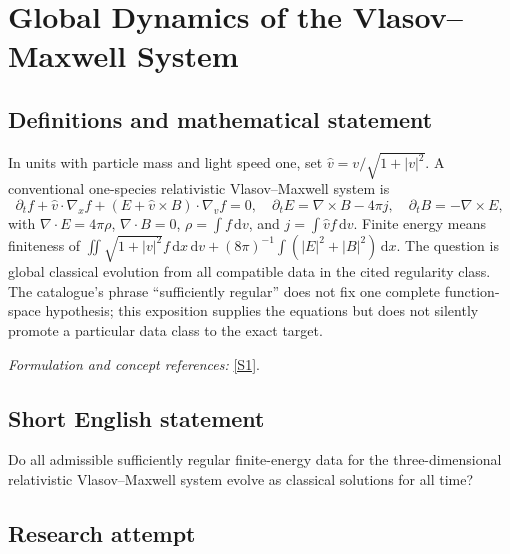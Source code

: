 \documentclass[11pt,a4paper]{article}
\newcommand{\dd}{\,\mathrm d}
\newcommand{\sref}[2]{\hyperlink{source:#1:#2}{[S#2]}}
\newif\ifshowcatalogue
\newcommand{\cataloguescope}[1]{\ifshowcatalogue
 \paragraph{Exact scope in the supplied catalogue.}
 \begin{quote}\small #1\end{quote}\fi}
\begin{document}
\setcounter{section}{0}
\clearpage
\section*{\texorpdfstring{Global Dynamics of the Vlasov–Maxwell System}{Global Dynamics of the Vlasov–Maxwell System}}\label{30006039}
\subsection{Definitions and mathematical statement}
In units with particle mass and light speed one, set $\widehat v=v/\sqrt{1+|v|^2}$. A conventional one-species relativistic Vlasov--Maxwell system is
\[
 \partial_tf+\widehat v\cdot\nabla_xf+(E+\widehat v\times B)\cdot\nabla_vf=0,
 \quad \partial_tE=\nabla\times B-4\pi j,\quad\partial_tB=-\nabla\times E,
\]
with $\nabla\cdot E=4\pi\rho$, $\nabla\cdot B=0$, $\rho=\int f\dd v$, and $j=\int\widehat v f\dd v$. Finite energy means finiteness of
$\iint\sqrt{1+|v|^2}f\dd x\dd v+(8\pi)^{-1}\int(|E|^2+|B|^2)\dd x$.
The question is global classical evolution from all compatible data in the cited regularity class. The catalogue's phrase ``sufficiently regular'' does not fix one complete function-space hypothesis; this exposition supplies the equations but does not silently promote a particular data class to the exact target.
\par\smallskip\textit{Formulation and concept references:} \sref{30006039}{1}.
\cataloguescope{Prove or disprove that the Cauchy problem for the three-dimensional relativistic Vlasov-Maxwell system has a global classical solution (f,E,B) for every sufficiently regular finite-energy initial datum.}
\subsection{Short English statement}
Do all admissible sufficiently regular finite-energy data for the three-dimensional relativistic Vlasov–Maxwell system evolve as classical solutions for all time?
\subsection{Research attempt}
\end{document}
